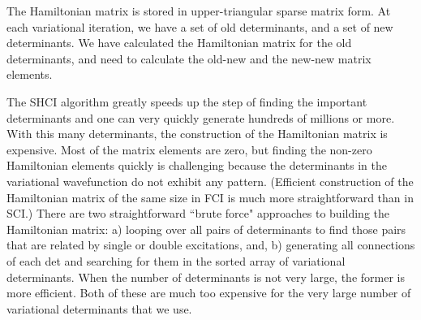 \documentclass[%
preprint,
 superscriptaddress,
 amsmath,amssymb,
 aps,
]{revtex4-1}
\begin{document}
The Hamiltonian matrix is stored in upper-triangular sparse matrix form.
At each variational iteration, we have a set of old determinants, and a set of new determinants.
We have calculated the Hamiltonian matrix for the old determinants, and need to calculate the old-new and the new-new
matrix elements.

The SHCI algorithm greatly speeds up the step of finding the important determinants and one can very quickly generate
hundreds of millions or more.  With this many determinants, the construction of the Hamiltonian matrix is expensive.
Most of the matrix elements are zero, but finding the non-zero Hamiltonian elements quickly is challenging because
the determinants in the variational wavefunction do not exhibit any pattern.
(Efficient construction of the Hamiltonian matrix of the same size in FCI is much more straightforward than in SCI.)
There are two straightforward ``brute force" approaches to building the Hamiltonian matrix:
a) looping over all pairs of determinants to find those pairs that are related by single or double excitations, and, b)
generating all connections of each det and searching for them in the sorted array of variational determinants.
When the number of determinants is not very large, the former is more efficient.
Both of these are much too expensive for the very large number of variational determinants that we use.
\end{document}
